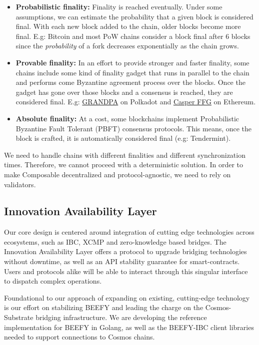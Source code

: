 \begin{itemize}
    \item \textbf{Probabilistic finality:} Finality is reached eventually. Under some assumptions, we can estimate the probability that a given block is considered final. With each new block added to the chain, older blocks become more final. E.g: Bitcoin and most PoW chains consider a block final after 6 blocks since the \textit{probability} of a fork decreases exponentially as the chain grows.
    
    \item \textbf{Provable finality:} In an effort to provide stronger and faster finality, some chains include some kind of finality gadget that runs in parallel to the  chain and performs come Byzantine agreement process over the blocks. Once the gadget has gone over those blocks and a consensus is reached, they are considered final. E.g: \href{https://github.com/w3f/consensus/blob/master/pdf/grandpa.pdf}{GRANDPA} on Polkadot and \href{https://arxiv.org/pdf/1710.09437.pdf}{Casper FFG} on Ethereum.
    
    \item \textbf{Absolute finality:} At a cost, some blockchains implement Probabilistic Byzantine Fault Tolerant (PBFT) consensus protocols. This means, once the block is crafted, it is automatically considered final (e.g: Tendermint).
\end{itemize}

We need to handle chains with different finalities and different synchronization times. Therefore, we cannot proceed with a deterministic solution. In order to make Composable decentralized and protocol-agnostic, we need to rely on validators.

\subsection{Innovation Availability Layer}
Our core design is centered around integration of cutting edge technologies across ecosystems, such as IBC, XCMP and zero-knowledge based bridges. The Innovation Availability Layer offers a protocol to upgrade bridging technologies without downtime, as well as an API stability guarantee for smart-contracts. Users and protocols alike will be able to interact through this singular interface to dispatch complex operations.

Foundational to our approach of expanding on existing, cutting-edge technology is our effort on stabilizing BEEFY and leading the charge on the Cosmos-Substrate bridging infrastructure. We are developing the reference implementation for BEEFY in Golang, as well as the BEEFY-IBC client libraries needed to support connections to Cosmos chains.
 
